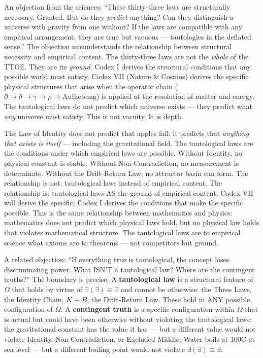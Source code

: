 \documentclass[10pt, openany, oneside]{book}
\begin{document}
An objection from the sciences: ``These thirty-three laws are structurally necessary. Granted. But do they \textit{predict} anything? Can they distinguish a universe with gravity from one without? If the laws are compatible with any empirical arrangement, they are true but vacuous --- tautologies in the deflated sense.'' The objection misunderstands the relationship between structural necessity and empirical content. The thirty-three laws are not the \textit{whole} of the TTOE. They are its \textit{ground}. Codex I derives the structural conditions that any possible world must satisfy. Codex VII (Nature \& Cosmos) derives the specific physical structures that arise when the operator chain ($\partial \to \delta \to \gamma \to \rho \to \text{Aufhebung}$) is applied at the resolution of matter and energy. The tautological laws do not predict which universe exists --- they predict what \textit{any} universe must satisfy. This is not vacuity. It is depth.

The Law of Identity does not predict that apples fall; it predicts that \textit{anything that exists is itself} --- including the gravitational field. The tautological laws are the conditions under which empirical laws are possible. Without Identity, no physical constant is stable. Without Non-Contradiction, no measurement is determinate. Without the Drift-Return Law, no attractor basin can form. The relationship is not: tautological laws instead of empirical content. The relationship is: tautological laws AS the ground of empirical content. Codex VII will derive the specific; Codex I derives the conditions that make the specific possible. This is the same relationship between mathematics and physics: mathematics does not predict which physical laws hold, but no physical law holds that violates mathematical structure. The tautological laws are to empirical science what axioms are to theorems --- not competitors but ground.

A related objection: ``If everything true is tautological, the concept loses discriminating power. What ISN'T a tautological law? Where are the contingent truths?'' The boundary is precise. A \textbf{tautological law} is a structural feature of $\Omega$ that holds by virtue of $\exists(\exists) \equiv \exists$ and cannot be otherwise: the Three Laws, the Identity Chain, $K \equiv B$, the Drift-Return Law. These hold in ANY possible configuration of $\Omega$. A \textbf{contingent truth} is a specific configuration within $\Omega$ that is actual but could have been otherwise without violating the tautological laws: the gravitational constant has the value it has --- but a different value would not violate Identity, Non-Contradiction, or Excluded Middle. Water boils at 100\textdegree C at sea level --- but a different boiling point would not violate $\exists(\exists) \equiv \exists$.
\end{document}

